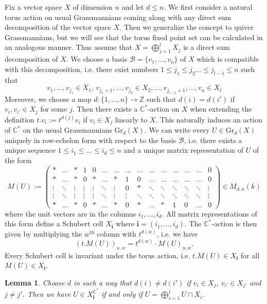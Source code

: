 \documentclass{amsart}
\newtheorem{lemma}[theorem]{Lemma}
\newcommand{\bfi}{\mathbf{i}}
\newcommand{\C}{\mathbb{C}}
\newcommand{\Gr}{\mathrm{Gr}}
\begin{document}
Fix a vector space $X$ of dimension $n$ and let $d\leq n$. We first consider a natural torus action on usual Grassmannians coming along with any direct sum decomposition of the vector space $X$. Then we generalize the concept to quiver Grassmannians, but we will see that the torus fixed point set can be calculated in an analogous manner. Thus assume that $X=\bigoplus_{j=1}^l X_j$ is a direct sum decomposition of $X$. We choose a basis $\mathcal B=\{v_1,\ldots,v_n\}$ of $X$ which is compatible with this decomposition, i.e. there exist numbers $1\leq j_1\leq j_2\ldots\leq j_{l-1}\leq n$ such that
\[v_1,\ldots,v_{j_1}\in X_1,\,v_{j_1+1},\ldots,v_{j_2}\in X_2,\ldots,v_{j_{l-1}+1},\ldots,v_{n}\in X_l\]
Moreover, we choose a map $d:\{1,\ldots,n\}\to\mathbb{Z}$ such that $d(i)=d(i')$ if $v_i,v_{i'}\in X_{j}$ for some $j$. Then there exists a $\C^\ast$-action on $X$ when extending the definition $t.v_i:=t^{d(j)}v_i$ if $v_i\in X_j$ linearly to $X$. This naturally induces an action of $\C^\ast$ on the usual Grassmannians $\Gr_d(X)$. We can write every $U\in\Gr_d(X)$ uniquely in row-echelon form with respect to the basis $\mathcal B$, i.e. there exists a unique sequence $1\leq i_1\leq\ldots\leq i_d\leq n$ and a unique matrix representation of $U$ of the form
\[M(U):=\begin{pmatrix}\ast&\ldots &\ast &1&0 &\ldots&\ldots&\ldots&\ldots&\ldots&\ldots&\ldots&\ldots&\ldots&0\\\ast&\ldots &\ast&0&\ast&\ldots &\ast&1&0&\ldots&\ldots&\ldots&\ldots&\ldots&0\\\vdots &\ddots&\vdots&\vdots&\vdots &\ddots&\vdots&0&\ast&\ddots&\ddots&\ddots&\ddots&\ddots&\vdots\\\vdots &\ddots&\vdots&\vdots&\vdots &\ddots&\vdots&\vdots&\ddots&\ddots&\ddots&\ddots&\ddots&\ddots&\vdots\\\ast&\ldots &\ast&0&\ast&\ldots &\ast&0&\ast&\ldots&\ast&1&0&\ldots&0\end{pmatrix}\in M_{d,n}(k)\]
where the unit vectors are in the columns $i_1,\ldots,i_d$. All matrix representations of this form define a Schubert cell $X_{\bfi}$ where $\bfi=(i_1,\ldots,i_d)$. The $\C^\ast$-action is then given by multiplying the $w^{\mathrm{th}}$ column with $t^{d(w)}$, i.e. we have
\[(t.M(U))_{u,w}=t^{d(w)}\cdot M(U)_{u,w}.\]
Every Schubert cell is invariant under the torus action, i.e. $t.M(U)\in X_\bfi$ for all $M(U)\in X_{\bfi}$. 
\begin{lemma}
  \label{usualGrass}
  Choose $d$ in such a way that $d(i)\neq d(i')$ if $v_i\in X_j$, $v_{i'}\in X_{j'}$ and $j\neq j'$.
  Then we have $U\in X_{\bfi}^{\C^\ast}$ if and only if $U=\bigoplus_{i=1}^l U\cap X_i$.
\end{lemma}
\end{document}
